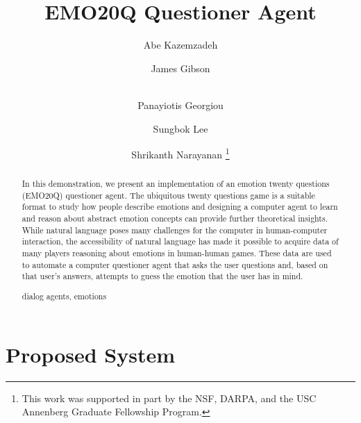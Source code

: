\documentclass[a4paper]{llncs}
\newcommand{\keywords}[1]{\par\addvspace\baselineskip
\noindent\keywordname\enspace\ignorespaces#1}
\begin{document}
\mainmatter  %

\title{EMO20Q Questioner Agent}




\author{Abe Kazemzadeh \and James Gibson \and \\ Panayiotis Georgiou \and Sungbok Lee  \and Shrikanth Narayanan 
\thanks {This work was supported in part by the NSF, DARPA, and the USC Annenberg Graduate Fellowship Program.}
}



\addtolength{\itemsep}{-0.05in}
\addtolength{\topsep}{-0.07in}
\addtolength{\textfloatsep}{-0.05in}
\addtolength{\intextsep}{-0.05in}
\addtolength{\partopsep}{-0.03in}
\addtolength{\parskip}{-0.02in}

\maketitle


\begin{abstract}
In this demonstration, we present an implementation of an emotion twenty
questions (EMO20Q) questioner agent.  
The ubiquitous twenty questions game is a suitable format to study how
people describe emotions and designing a computer agent to learn and reason
about abstract emotion concepts can provide further theoretical insights.
While natural language poses many challenges for the computer in
human-computer interaction, the accessibility of natural language has made it
possible to acquire data of many players reasoning about emotions in
human-human games.  These data are used to automate a computer questioner
agent that asks the user questions and, based on that user's answers, attempts
to guess the emotion that the user has in mind.  \keywords{dialog agents,
  emotions}
\end{abstract}


\section{Proposed System}
\end{document}
